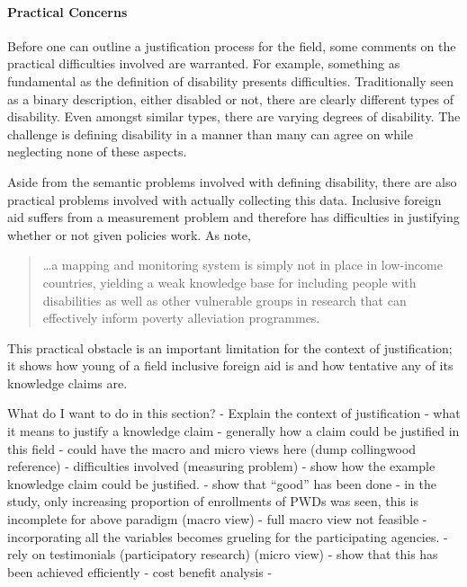 \documentclass[a4paper]{article}
\begin{document}
\paragraph{Practical Concerns}

Before one can outline a justification process for the field, some comments on
the practical difficulties involved are warranted. For example, something as
fundamental as the definition of disability presents difficulties.
Traditionally seen as a binary description, either disabled or not, there are
clearly different types of disability. Even amongst similar types, there are
varying degrees of disability. The challenge is defining disability in a
manner than many can agree on while neglecting none of these aspects.

Aside from the semantic problems involved with defining disability, there are
also practical problems involved with actually collecting this data.
Inclusive foreign aid suffers from a measurement problem and therefore has
difficulties in justifying whether or not given policies work. As
\cite{ingstad2011disability} note,
%
\begin{quote}
    \ldots a mapping and monitoring system is simply not in place in
    low-income countries, yielding a weak knowledge base for including people
    with disabilities as well as other vulnerable groups in research that can
    effectively inform poverty alleviation programmes.
\end{quote}
%
This practical obstacle is an important limitation for the context of
justification; it shows how young of a field inclusive foreign aid is and how
tentative any of its knowledge claims are.


What do I want to do in this section?
- Explain the context of justification
    - what it means to justify a knowledge claim
    - generally how a claim could be justified in this field
        - could have the macro and micro views here (dump collingwood
          reference)
        - difficulties involved (measuring problem)
- show how the example knowledge claim could be justified.
    - show that ``good'' has been done
        - in the study, only increasing proportion of enrollments of PWDs was
          seen, this is incomplete for above paradigm (macro view)
            - full macro view not feasible
                - incorporating all the variables becomes grueling for the
                participating agencies.
        - rely on testimonials (participatory research) (micro view)
    - show that this has been achieved efficiently
        - cost benefit analysis
-
\end{document}
